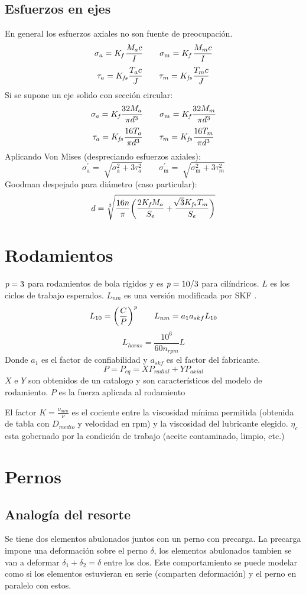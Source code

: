 \documentclass[twocolumn,10pt]{article}
\newcommand{\bigpar}[1]{\bigg(
#1 \bigg) }
\newcommand{\Kf}[1]{ K_{\textit{\textrm{f}}_{\textrm{#1}}} }
\newcommand{\Kfs}[1]{ K_{\textit{\textrm{fs}}_{\textrm{#1}}} }
\newcommand{\siga}[1]{ \sigma_{{\textrm{a}}_{\textrm{#1}}} }
\newcommand{\sigm}[1]{ \sigma_{{\textrm{m}}_{\textrm{#1}}} }
\newcommand{\pe}{\textit{\textrm{p}}}
\begin{document}
\subsection{Esfuerzos en ejes}
En general los esfuerzos axiales no son fuente de preocupación.
$$\sigma_a=\Kf{} \,\frac{M_ac}{I}\qquad \sigm{}=\Kf{}\, \frac{M_mc}{I}$$
$$\tau_a =\Kfs{}  \frac{T_a c}{J} \qquad \tau_m=\Kfs{} \frac{T_m c}{J} $$
Si se supone un eje solido con sección circular:
$$\sigma_a=\Kf{} \frac{32M_a}{\pi d^3}\qquad \sigm{}=\Kf{} \frac{32M_m}{\pi d^3}$$
$$\tau_a =\Kfs{}  \frac{16T_a}{\pi d^3}\qquad \tau_m=\Kfs{} \frac{16T_m}{\pi d^3}$$
Aplicando Von Mises (despreciando esfuerzos axiales):
$$\siga{}^\prime =\sqrt[]{\siga{}^2+3\tau_a^2} \qquad \sigm{}^\prime =\sqrt[]{\sigm{}^2+3\tau_m^2}$$
Goodman despejado para diámetro (caso particular):
$$d = \sqrt[3]{\frac{16n}{\pi} \bigpar{\frac{2\Kf{}M_a}{S_e}+\frac{\sqrt[]{3}\Kfs{} T_m}{S_e}}} $$
\section{Rodamientos}
$\pe=3$ para rodamientos de bola rígidos y es $\pe=10/3$ para cilíndricos. $L$ es los ciclos de trabajo esperados. $L_{nm}$ es una versión modificada por {\scshape\textrm{SKF} }.
$$L_{10}=\bigpar{\frac{C}{P}}^\pe\qquad L_{nm}=a_1a_{skf}L_{10}  $$
$$L_{horas}=\frac{10^6}{60n_{rpm} }L$$
Donde $a_1$ es el factor de confiabilidad y $a_{skf}$ es el factor del fabricante.
$$ P=P_{eq}=X P_{radial}+Y P_{axial} $$
$X$ e $Y$ son obtenidos de un catalogo y son característicos del modelo de rodamiento. $P$ es la fuerza aplicada al rodamiento\par
El factor $K=\frac{\nu_{min} }{\nu}$ es el cociente entre la viscosidad mínima permitida (obtenida de tabla con $D_{medio}$ y velocidad en rpm) y la viscosidad del lubricante elegido. $\eta_c$ esta gobernado por la condición de trabajo (aceite contaminado, limpio, etc.)

\section{Pernos}
\subsection{Analogía del resorte}
Se tiene dos elementos abulonados juntos con un perno con precarga. La precarga impone una deformación sobre el perno $\delta$, los elementos abulonados tambien se van a deformar $\delta_1+\delta_2=\delta$ entre los dos. Este comportamiento se puede modelar como si los elementos estuvieran en serie (comparten deformación) y el perno en paralelo con estos.
\end{document}
